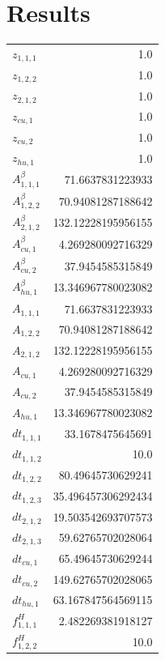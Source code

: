 \documentclass{article}%
\makeatletter
\let\mcnewpage=\newpage%
\newcommand{\TrickSupertabularIntoMulticols}{%
\renewcommand\newpage{%
\if@firstcolumn%
\hrule width\linewidth height0pt%
\columnbreak%
\else%
\mcnewpage%
\fi%
}%
}%
\makeatother
\begin{document}
\section{Results}%
\thispagestyle{plain}%
\begin{multicols*}{3}%
\TrickSupertabularIntoMulticols%
%
\begin{supertabular}{lr}%
	$z_{1,1,1}$ & 1.0 \\%
	$z_{1,2,2}$ & 1.0 \\%
	$z_{2,1,2}$ & 1.0 \\%
	$z_{cu,1}$ & 1.0 \\%
	$z_{cu,2}$ & 1.0 \\%
	$z_{hu,1}$ & 1.0 \\%
	$A_{1,1,1}^{\beta}$ & 71.6637831223933 \\%
	$A_{1,2,2}^{\beta}$ & 70.94081287188642 \\%
	$A_{2,1,2}^{\beta}$ & 132.12228195956155 \\%
	$A_{cu,1}^{\beta}$ & 4.269280092716329 \\%
	$A_{cu,2}^{\beta}$ & 37.9454585315849 \\%
	$A_{hu,1}^{\beta}$ & 13.346967780023082 \\%
	$A_{1,1,1}$ & 71.6637831223933 \\%
	$A_{1,2,2}$ & 70.94081287188642 \\%
	$A_{2,1,2}$ & 132.12228195956155 \\%
	$A_{cu,1}$ & 4.269280092716329 \\%
	$A_{cu,2}$ & 37.9454585315849 \\%
	$A_{hu,1}$ & 13.346967780023082 \\%
	$dt_{1,1,1}$ & 33.1678475645691 \\%
	$dt_{1,1,2}$ & 10.0 \\%
	$dt_{1,2,2}$ & 80.49645730629241 \\%
	$dt_{1,2,3}$ & 35.496457306292434 \\%
	$dt_{2,1,2}$ & 19.503542693707573 \\%
	$dt_{2,1,3}$ & 59.62765702028064 \\%
	$dt_{cu,1}$ & 65.49645730629244 \\%
	$dt_{cu,2}$ & 149.62765702028065 \\%
	$dt_{hu,1}$ & 63.167847564569115 \\%
	$f_{1,1,1}^{H}$ & 2.482269381918127 \\%
	$f_{1,2,2}^{H}$ & 10.0 \\%

\end{supertabular}
\end{multicols*}
\end{document}
